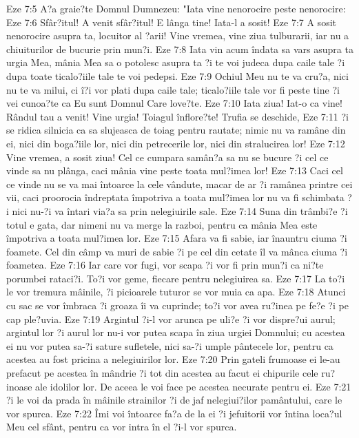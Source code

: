 Eze 7:5  A?a graie?te Domnul Dumnezeu: "Iata vine nenorocire peste nenorocire:
Eze 7:6  Sfâr?itul! A venit sfâr?itul! E lânga tine! Iata-l a sosit!
Eze 7:7  A sosit nenorocire asupra ta, locuitor al ?arii! Vine vremea, vine ziua tulburarii, iar nu a chiuiturilor de bucurie prin mun?i.
Eze 7:8  Iata vin acum îndata sa vars asupra ta urgia Mea, mânia Mea sa o potolesc asupra ta ?i te voi judeca dupa caile tale ?i dupa toate ticalo?iile tale te voi pedepsi.
Eze 7:9  Ochiul Meu nu te va cru?a, nici nu te va milui, ci î?i vor plati dupa caile tale; ticalo?iile tale vor fi peste tine ?i vei cunoa?te ca Eu sunt Domnul Care love?te.
Eze 7:10  Iata ziua! Iat-o ca vine! Rândul tau a venit! Vine urgia! Toiagul înflore?te! Trufia se deschide,
Eze 7:11  ?i se ridica silnicia ca sa slujeasca de toiag pentru rautate; nimic nu va ramâne din ei, nici din boga?iile lor, nici din petrecerile lor, nici din stralucirea lor!
Eze 7:12  Vine vremea, a sosit ziua! Cel ce cumpara samân?a sa nu se bucure ?i cel ce vinde sa nu plânga, caci mânia vine peste toata mul?imea lor!
Eze 7:13  Caci cel ce vinde nu se va mai întoarce la cele vândute, macar de ar ?i ramânea printre cei vii, caci proorocia îndreptata împotriva a toata mul?imea lor nu va fi schimbata ?i nici nu-?i va întari via?a sa prin nelegiuirile sale.
Eze 7:14  Suna din trâmbi?e ?i totul e gata, dar nimeni nu va merge la razboi, pentru ca mânia Mea este împotriva a toata mul?imea lor.
Eze 7:15  Afara va fi sabie, iar înauntru ciuma ?i foamete. Cel din câmp va muri de sabie ?i pe cel din cetate îl va mânca ciuma ?i foametea.
Eze 7:16  Iar care vor fugi, vor scapa ?i vor fi prin mun?i ca ni?te porumbei rataci?i. To?i vor geme, fiecare pentru nelegiuirea sa.
Eze 7:17  La to?i le vor tremura mâinile, ?i picioarele tuturor se vor muia ca apa.
Eze 7:18  Atunci cu sac se vor îmbraca ?i groaza îi va cuprinde; to?i vor avea ru?inea pe fe?e ?i pe cap ple?uvia.
Eze 7:19  Argintul ?i-l vor arunca pe uli?e ?i vor dispre?ui aurul; argintul lor ?i aurul lor nu-i vor putea scapa în ziua urgiei Domnului; cu acestea ei nu vor putea sa-?i sature sufletele, nici sa-?i umple pântecele lor, pentru ca acestea au fost pricina a nelegiuirilor lor.
Eze 7:20  Prin gateli frumoase ei le-au prefacut pe acestea în mândrie ?i tot din acestea au facut ei chipurile cele ru?inoase ale idolilor lor. De aceea le voi face pe acestea necurate pentru ei.
Eze 7:21  ?i le voi da prada în mâinile strainilor ?i de jaf nelegiui?ilor pamântului, care le vor spurca.
Eze 7:22  Îmi voi întoarce fa?a de la ei ?i jefuitorii vor întina loca?ul Meu cel sfânt, pentru ca vor intra în el ?i-l vor spurca.
